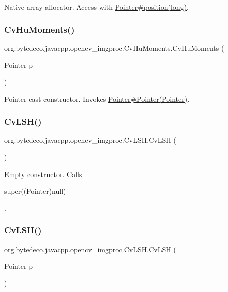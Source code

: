 Native array allocator. Access with \hyperlink{}{Pointer\#position(long)}. \mbox{\label{group__imgproc_gabbb1bbfe04e1af632620c299c521d9cb}} 
\subsubsection{\texorpdfstring{Cv\+Hu\+Moments()}{CvHuMoments()}\hspace{0.1cm}{\footnotesize\ttfamily [3/3]}}
{\footnotesize\ttfamily org.\+bytedeco.\+javacpp.\+opencv\+\_\+imgproc.\+Cv\+Hu\+Moments.\+Cv\+Hu\+Moments (\begin{DoxyParamCaption}\item[{Pointer}]{p }\end{DoxyParamCaption})\hspace{0.3cm}{\ttfamily [inline]}}

Pointer cast constructor. Invokes \hyperlink{}{Pointer\#\+Pointer(\+Pointer)}. \mbox{\label{group__imgproc_gaaeb804ef7f6cb4b94f94461f5076c801}} 
\subsubsection{\texorpdfstring{Cv\+L\+S\+H()}{CvLSH()}\hspace{0.1cm}{\footnotesize\ttfamily [1/2]}}
{\footnotesize\ttfamily org.\+bytedeco.\+javacpp.\+opencv\+\_\+imgproc.\+Cv\+L\+S\+H.\+Cv\+L\+SH (\begin{DoxyParamCaption}{ }\end{DoxyParamCaption})\hspace{0.3cm}{\ttfamily [inline]}}

Empty constructor. Calls
\begin{DoxyCode}
super((Pointer)null) 
\end{DoxyCode}
 . \mbox{\label{group__imgproc_gae5c4e2c53fa50e1dd7dd6aa81c31b5ee}} 
\subsubsection{\texorpdfstring{Cv\+L\+S\+H()}{CvLSH()}\hspace{0.1cm}{\footnotesize\ttfamily [2/2]}}
{\footnotesize\ttfamily org.\+bytedeco.\+javacpp.\+opencv\+\_\+imgproc.\+Cv\+L\+S\+H.\+Cv\+L\+SH (\begin{DoxyParamCaption}\item[{Pointer}]{p }\end{DoxyParamCaption})\hspace{0.3cm}{\ttfamily [inline]}}

